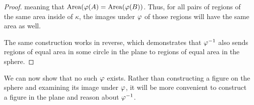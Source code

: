 \begin{proof}
{}
  
  meaning that $\mathrm{Area}(\varphi(A) = \mathrm{Area}(\varphi(B))$. 
  Thus, for all pairs of regions of the same area inside of $\kappa$, the images 
  under $\varphi$ of those regions will have the same area as well.
  
  The same construction works in reverse, which demonstrates that  $\varphi^{-1}$ also sends 
  regions of equal area in some circle in the plane to regions of  equal area in the sphere.
  
 \end{proof} 



We can now show that no such $\varphi$ exists.  Rather than constructing a figure on the sphere and examining its image under $\varphi$, it will be more convenient to construct a figure in the plane and reason about $\varphi^{-1}$.
 
